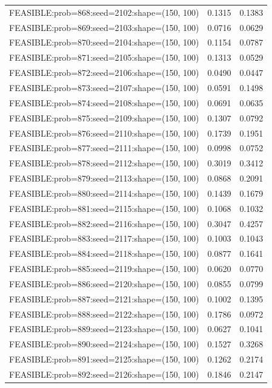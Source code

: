 \begin{longtable}{lcc}
FEASIBLE:prob=868:seed=2102:shape=(150, 100) &   0.1315 & 0.1383 \\
FEASIBLE:prob=869:seed=2103:shape=(150, 100) &   0.0716 & 0.0629 \\
FEASIBLE:prob=870:seed=2104:shape=(150, 100) &   0.1154 & 0.0787 \\
FEASIBLE:prob=871:seed=2105:shape=(150, 100) &   0.1313 & 0.0529 \\
FEASIBLE:prob=872:seed=2106:shape=(150, 100) &   0.0490 & 0.0447 \\
FEASIBLE:prob=873:seed=2107:shape=(150, 100) &   0.0591 & 0.1498 \\
FEASIBLE:prob=874:seed=2108:shape=(150, 100) &   0.0691 & 0.0635 \\
FEASIBLE:prob=875:seed=2109:shape=(150, 100) &   0.1307 & 0.0792 \\
FEASIBLE:prob=876:seed=2110:shape=(150, 100) &   0.1739 & 0.1951 \\
FEASIBLE:prob=877:seed=2111:shape=(150, 100) &   0.0998 & 0.0752 \\
FEASIBLE:prob=878:seed=2112:shape=(150, 100) &   0.3019 & 0.3412 \\
FEASIBLE:prob=879:seed=2113:shape=(150, 100) &   0.0868 & 0.2091 \\
FEASIBLE:prob=880:seed=2114:shape=(150, 100) &   0.1439 & 0.1679 \\
FEASIBLE:prob=881:seed=2115:shape=(150, 100) &   0.1068 & 0.1032 \\
FEASIBLE:prob=882:seed=2116:shape=(150, 100) &   0.3047 & 0.4257 \\
FEASIBLE:prob=883:seed=2117:shape=(150, 100) &   0.1003 & 0.1043 \\
FEASIBLE:prob=884:seed=2118:shape=(150, 100) &   0.0877 & 0.1641 \\
FEASIBLE:prob=885:seed=2119:shape=(150, 100) &   0.0620 & 0.0770 \\
FEASIBLE:prob=886:seed=2120:shape=(150, 100) &   0.0855 & 0.0799 \\
FEASIBLE:prob=887:seed=2121:shape=(150, 100) &   0.1002 & 0.1395 \\
FEASIBLE:prob=888:seed=2122:shape=(150, 100) &   0.1786 & 0.0972 \\
FEASIBLE:prob=889:seed=2123:shape=(150, 100) &   0.0627 & 0.1041 \\
FEASIBLE:prob=890:seed=2124:shape=(150, 100) &   0.1527 & 0.3268 \\
FEASIBLE:prob=891:seed=2125:shape=(150, 100) &   0.1262 & 0.2174 \\
FEASIBLE:prob=892:seed=2126:shape=(150, 100) &   0.1846 & 0.2147 \\

\end{longtable}

